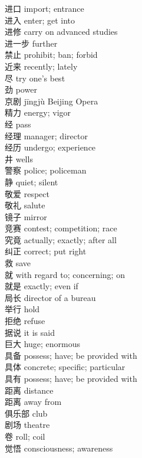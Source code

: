 进口 \quad import; entrance\\
进入 \quad enter; get into\\
进修 \quad carry on advanced studies\\
进一步 \quad further\\
禁止 \quad prohibit; ban; forbid\\
近来 \quad recently; lately\\
尽 \quad try one's best\\
劲 \quad power\\
京剧 \quad jīngjù \quad Beijing Opera\\
精力 \quad energy; vigor\\
经 \quad pass\\
经理 \quad manager; director\\
经历 \quad undergo; experience\\
井 \quad wells\\
警察 \quad police; policeman\\
静 \quad quiet; silent\\
敬爱 \quad respect\\
敬礼 \quad salute\\
镜子 \quad mirror\\
竞赛 \quad contest; competition; race\\
究竟 \quad actually; exactly; after all\\
纠正 \quad correct; put right\\
救 \quad save\\
就 \quad with regard to; concerning; on\\
就是 \quad exactly; even if\\
局长 \quad director of a bureau\\
举行 \quad hold\\
拒绝 \quad refuse\\
据说 \quad it is said\\
巨大 \quad huge; enormous\\
具备 \quad possess; have; be provided with\\
具体 \quad concrete; specific; particular\\
具有 \quad possess; have; be provided with\\
距离 \quad distance\\
距离 \quad away from\\
俱乐部 \quad club\\
剧场 \quad theatre\\
卷 \quad roll; coil\\
觉悟 \quad consciousness; awareness\\
